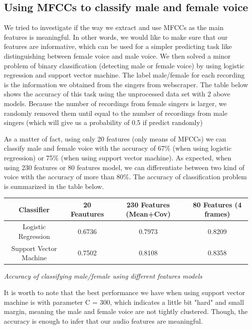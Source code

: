 \documentclass[paper=a4, fontsize=11pt, DIV=13]{scrartcl}
\begin{document}
\subsection{Using MFCCs to classify male and female voice}

We tried to investigate if the way we extract and use MFCCs as the main features is meaningful. In other words, we would like to make sure that our features are informative, which can be used for a simpler predicting task like distinguishing between female voice and male voice. We then solved a minor problem of binary classification (detecting male or female voice) by using logistic regression and support vector machine. The label male/female for each recording is the information we obtained from the singers from webscraper. The table below shows the accuracy of this task using the unprocessed data set with 2 above models. Because the number of recordings from female singers is larger, we randomly removed them until equal to the number of recordings from male singers (which will give us a probability of 0.5 if predict randomly)

As a matter of fact, using only 20 features (only means of MFCCs) we can classify male and female voice with the accuracy of 67\% (when using logistic regression) or 75\% (when using support vector machine). As expected, when using 230 features or 80 features model, we can differentiate between two kind of voice with the accuracy of more than 80\%. The accuracy of classification problem is summarized in the table below.

\begin{center}
 \begin{tabular}{|c | c c c|} 
 \hline
 Classifier & 20 Feautures  & 230 Features (Mean+Cov) & 80 Features (4 frames) \\ [0.5ex] 
 \hline\hline
 Logistic Regression & 0.6736 & 0.7973 & 0.8209 \\ 
 \hline
 Support Vector Machine & 0.7502 & 0.8108 & 0.8358 \\
 \hline
\end{tabular}
\end{center}
\begin{center}

\textit{Accuracy of classifying male/female using different features models}
\end{center}

It is worth to note that the best performance we have when using support vector machine is with parameter C = 300, which indicates a little bit "hard" and small margin, meaning the male and female voice are not tightly clustered. Though, the accuracy is enough to infer that our audio features are meaningful.
\end{document}
